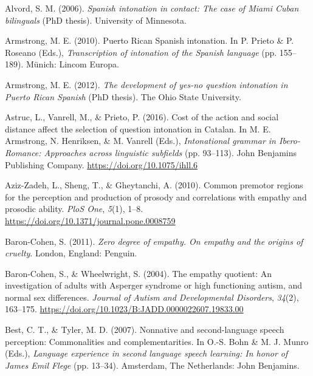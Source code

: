 \documentclass[]{article}
\newlength{\cslhangindent}
\newenvironment{CSLReferences}[2] %
 {%
  \setlength{\parindent}{0pt}
  \ifodd #1 \everypar{\setlength{\hangindent}{\cslhangindent}}\ignorespaces\fi
  \ifnum #2 > 0
  \setlength{\parskip}{#2\baselineskip}
  \fi
 }%
 {}
\begin{document}
\hypertarget{refs}{}
\begin{CSLReferences}{1}{0}
\leavevmode{}%
Alvord, S. M. (2006). \emph{Spanish intonation in contact: The case of {M}iami {C}uban bilinguals} (PhD thesis). University of Minnesota.

\leavevmode{}%
Armstrong, M. E. (2010). Puerto {R}ican {S}panish intonation. In P. Prieto \& P. Roseano (Eds.), \emph{Transcription of intonation of the {S}panish language} (pp. 155--189). Münich: Lincom Europa.

\leavevmode{}%
Armstrong, M. E. (2012). \emph{The development of yes-no question intonation in {P}uerto {R}ican {S}panish} (PhD thesis). The Ohio State University.

\leavevmode{}%
Astruc, L., Vanrell, M., \& Prieto, P. (2016). Cost of the action and social distance affect the selection of question intonation in {C}atalan. In M. E. Armstrong, N. Henriksen, \& M. Vanrell (Eds.), \emph{Intonational grammar in {I}bero-{R}omance: {A}pproaches across linguistic subfields} (pp. 93--113). John Benjamins Publishing Company. \url{https://doi.org/10.1075/ihll.6}

\leavevmode{}%
Aziz-Zadeh, L., Sheng, T., \& Gheytanchi, A. (2010). Common premotor regions for the perception and production of prosody and correlations with empathy and prosodic ability. \emph{PloS One}, \emph{5}(1), 1--8. \url{https://doi.org/10.1371/journal.pone.0008759}

\leavevmode{}%
Baron-Cohen, S. (2011). \emph{Zero degree of empathy. On empathy and the origins of cruelty}. London, England: Penguin.

\leavevmode{}%
Baron-Cohen, S., \& Wheelwright, S. (2004). The empathy quotient: An investigation of adults with {A}sperger syndrome or high functioning autism, and normal sex differences. \emph{Journal of Autism and Developmental Disorders}, \emph{34}(2), 163--175. \url{https://doi.org/10.1023/B:JADD.0000022607.19833.00}

\leavevmode{}%
Best, C. T., \& Tyler, M. D. (2007). Nonnative and second-language speech perception: {C}ommonalities and complementarities. In O.-S. Bohn \& M. J. Munro (Eds.), \emph{Language experience in second language speech learning: {I}n honor of {James Emil Flege}} (pp. 13--34). Amsterdam, The Netherlands: John Benjamins.


\end{CSLReferences}
\end{document}
